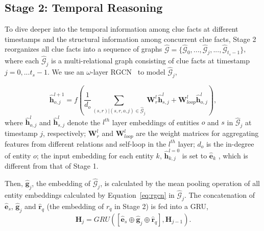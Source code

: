 \documentclass[11pt,a4paper]{article}
\begin{document}
\subsection{Stage 2: Temporal Reasoning}\label{temporal reasoning} To dive
deeper into the temporal information among clue facts at different timestamps
and the structural information among concurrent clue facts, Stage 2 reorganizes
all clue facts into a sequence of graphs $\hat{\mathcal{G}} =
\{\hat{\mathcal{G}}_0, ..., \hat{\mathcal{G}}_{j},
...,\hat{\mathcal{G}}_{t_{s}-1}\}$, where each $\hat{\mathcal{G}}_{j}$ is a
multi-relational graph consisting of clue facts at timestamp $j=0,...t_s-1$. We use an
$\omega$-layer RGCN~\cite{schlichtkrull2018modeling} to model
$\hat{\mathcal{G}}_{j}$,



%
\begin{equation} \label{eq:rgcn}
  \hat{\mathbf{h}}_{o, j}^{l+1}=f\!\!\left(\!\!\frac{1}{d_{o}}\!\sum_{(s, r)|(s, r, o, j)\in \hat{\mathcal{G}}_{j} }\!\!\mathbf{W}_{r}^{l}\hat{\mathbf{h}}_{s, j}^{l}
   \!+\!  \mathbf{W}_{loop}^{l}\hat{\mathbf{h}}_{o,j}^{l}\!\!\right)\!, 
  \end{equation}
where $\hat{\mathbf{h}}_{o,j}^{l}$ and $\hat{\mathbf{h}}_{s,j}^{l}$ denote the $l^{th}$
layer embeddings of entities $o$ and $s$ in $\hat{\mathcal{G}}_{j}$ at timestamp
$j$, respectively; $\mathbf{W}_{r}^{l}$ and $\mathbf{W}_{loop}^{l}$ are the weight
matrices for aggregating features from different relations and self-loop in the
$l^{th}$ layer; $d_{o}$ is the in-degree of entity $o$; the input embedding
for each entity $k$, $\hat{\mathbf{h}}_{k,j}^{l=0}$ is set to $\hat{\mathbf{e}}_k$
, which is different from that of Stage 1. 

Then, $\hat{\mathbf{g}}_{j}$, the embedding of $\hat{\mathcal{G}}_{j}$, is
calculated by the mean pooling operation of all entity embeddings calculated by
Equation~\ref{eq:rgcn} in $\hat{\mathcal{G}}_{j}$. The concatenation of
$\hat{\mathbf{e}}_{s}$, $\hat{\mathbf{g}}_{j}$ and $\hat{\mathbf{r}}_{q}$ (the
embedding of $r_q$ in Stage 2) is fed into a GRU,
%
\begin{equation}\label{eq:rnn}
\mathbf{H}_{j} = GRU([\hat{\mathbf{e}}_{s}\oplus\hat{\mathbf{g}}_{j}\oplus\hat{\mathbf{r}}_{q}], \mathbf{H}_{j-1}).
\end{equation}
%
\end{document}
